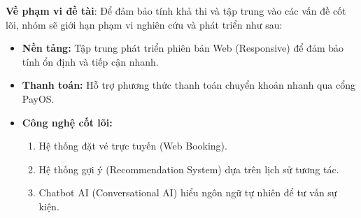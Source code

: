 \indent \textbf{Về phạm vi đề tài}: Để đảm bảo tính khả thi và tập trung vào các vấn đề cốt lõi, nhóm sẽ giới hạn phạm vi nghiên cứu và phát triển như sau:
\begin{itemize}
\item[1.] \textbf{Nền tảng:} Tập trung phát triển phiên bản Web (Responsive) để đảm bảo tính ổn định và tiếp cận nhanh.
\item[2.] \textbf{Thanh toán:} Hỗ trợ phương thức thanh toán chuyển khoản nhanh qua cổng PayOS.
\item[3.] \textbf{Công nghệ cốt lõi:}
\begin{enumerate}
\item[-] Hệ thống đặt vé trực tuyến (Web Booking).
\item[-] Hệ thống gợi ý (Recommendation System) dựa trên lịch sử tương tác.
\item[-] Chatbot AI (Conversational AI) hiểu ngôn ngữ tự nhiên để tư vấn sự kiện.
\end{enumerate}
\end{itemize}
